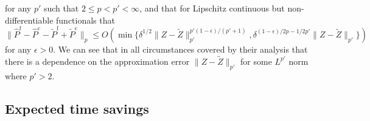 \documentclass[9pt,a4paper,english]{extarticle}
\begin{document}
for any  $ p' $ such that $ 2 \leq p < p' < \infty $, and that for Lipschitz continuous but non-differentiable functionals that 
\begin{equation*}
\lVert \widehat{P}^{\mathrm{f}} - \widehat{P}^{\mathrm{c}} - \widetilde{P}^{\mathrm{f}} + \widetilde{P}^{\mathrm{c}}\rVert_p 
\leq O(\min\{
\delta^{1/2} \lVert Z - \widetilde{Z} \rVert_{p'}^{p'(1-\epsilon)/(p'+1)},
\delta^{(1-\epsilon)/2p -1/2p'}    \lVert Z - \widetilde{Z} \rVert_{p'}
\})
\end{equation*}
for any  $ \epsilon > 0 $. We can see that in all circumstances covered by their analysis that there is a dependence on the approximation error $  \lVert Z - \widetilde{Z} \rVert_{p'} $ for some $ L^{p'} $ norm where $ p' > 2 $.

\subsection{Expected time savings}
\end{document}
